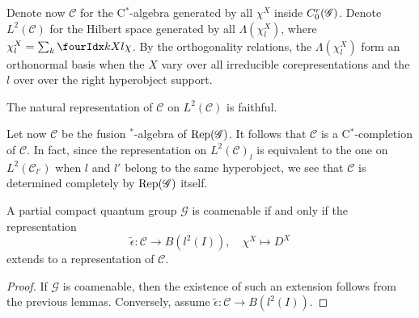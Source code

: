 Denote now $\mathcal{C}$ for the C$^*$-algebra generated by all $\chi^X$ inside $C^{r}_{0}(\mathscr{G})$. Denote $L^2(\mathcal{C})$ for the Hilbert space generated by all $\Lambda(\chi^X_l)$, where $\chi^X_l = \sum_{k} \Gr{\chi}{}{X}{k}{l}$. By the orthogonality relations, the $\Lambda(\chi^X_l)$ form an orthonormal basis when the $X$ vary over all irreducible corepresentations and the $l$ over over the right hyperobject support.
 
\begin{Lem} The natural representation of $\mathcal{C}$ on $L^2(\mathcal{C})$ is faithful.
\end{Lem} 

Let now $\mathscr{C}$ be the fusion $^*$-algebra of $\mathrm{Rep}(\mathscr{G})$. It follows that $\mathcal{C}$ is a C$^*$-completion of $\mathscr{C}$. In fact, since the representation on $L^2(\mathcal{C})_l$ is equivalent to the one on $L^2(\mathcal{C}_{l'})$ when $l$ and $l'$ belong to the same hyperobject, we see that $\mathcal{C}$ is determined completely by $\mathrm{Rep}(\mathscr{G})$ itself.  

\begin{Theorem} A partial compact quantum group $\mathscr{G}$ is coamenable if and only if the representation \[\tilde{\epsilon}: \mathscr{C} \rightarrow B(l^2(I)), \quad \chi^X \mapsto D^X\] extends to a representation of $\mathcal{C}$.
\end{Theorem}
\begin{proof} If $\mathscr{G}$ is coamenable, then the existence of such an extension follows from the previous lemmas. Conversely, assume $\tilde{\epsilon}:\mathcal{C}\rightarrow B(l^2(I))$. 
\end{proof}  
 
 
